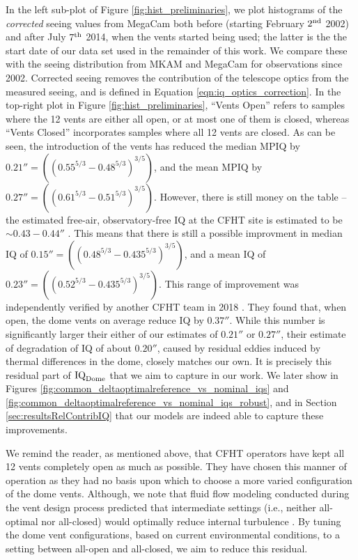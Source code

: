 In the left sub-plot of Figure \ref{fig:hist_preliminaries}, we plot histograms of the \textit{corrected} seeing values from MegaCam both before (starting February $2^{\rm nd}$ 2002) and after July $7^{\rm th}$ 2014, when the vents started being used; the latter is the the start date of our data set used in the remainder of this work. We compare these with the seeing distribution from MKAM and MegaCam for observations since 2002. Corrected seeing removes the contribution of the telescope optics from the measured seeing, and is defined in Equation \ref{eqn:iq_optics_correction}. In the top-right plot in Figure \ref{fig:hist_preliminaries}, ``Vents Open'' refers to samples where the 12 vents are either all open, or at most one of them is closed, whereas ``Vents Closed'' incorporates samples where all 12 vents are closed. As can be seen, the introduction of the vents has reduced the median MPIQ by $0.21'' = \left((0.55^{5/3}-0.48^{5/3})^{3/5}\right)$, and the mean MPIQ by $0.27'' = \left((0.61^{5/3}-0.51^{5/3})^{3/5}\right)$. However, there is still money on the table -- the estimated free-air, observatory-free IQ at the CFHT site is estimated to be $\sim0.43-0.44''$ \citep{salmon2009cfht}. This means that there is still a possible improvment in median IQ of $0.15'' = \left((0.48^{5/3}-0.435^{5/3})^{3/5}\right)$, and a mean IQ of $0.23'' = \left((0.52^{5/3}-0.435^{5/3})^{3/5}\right)$. This range of improvement was independently verified by another CFHT team in 2018 \citep{racine2018}. They found that, when open, the dome vents on average reduce IQ by $0.37''$. While this number is significantly larger their either of our estimates of $0.21''$ or $0.27''$, their estimate of degradation of IQ of about $0.20''$, caused by residual eddies induced by thermal differences in the dome, closely matches our own. It is precisely this residual part of $\textrm{IQ}_{\textrm{Dome}}$ that we aim to capture in our work. We later show in Figures \ref{fig:common_deltaoptimalreference_vs_nominal_iqs} and \ref{fig:common_deltaoptimalreference_vs_nominal_iqs_robust}, and in Section \ref{sec:resultsRelContribIQ} that our models are indeed able to capture these improvements.

We remind the reader, as mentioned above, that CFHT operators have kept all 12 vents completely open as much as possible.  They have chosen this manner of operation as they had no basis upon which to choose a more varied configuration of the dome vents.  Although, we note that fluid flow modeling conducted during the vent design process predicted that intermediate settings (i.e., neither all-optimal nor all-closed) would optimally reduce internal turbulence \citep{wind_tunnel_test}. By tuning the dome vent configurations, based on current environmental conditions, to a setting between all-open and all-closed, we aim to reduce this residual.

